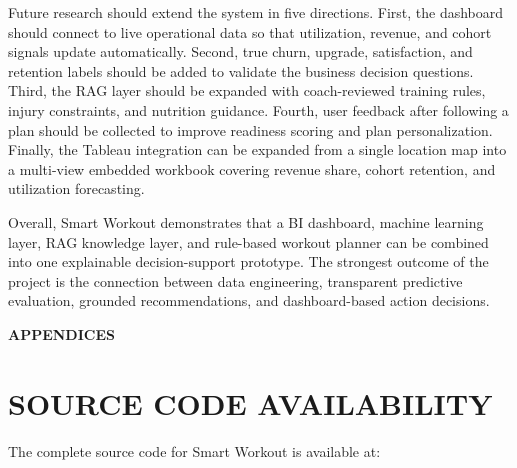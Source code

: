 \documentclass{aitthesis}
\begin{document}
Future research should extend the system in five directions. First, the dashboard should connect to live operational data so that utilization, revenue, and cohort signals update automatically. Second, true churn, upgrade, satisfaction, and retention labels should be added to validate the business decision questions. Third, the RAG layer should be expanded with coach-reviewed training rules, injury constraints, and nutrition guidance. Fourth, user feedback after following a plan should be collected to improve readiness scoring and plan personalization. Finally, the Tableau integration can be expanded from a single location map into a multi-view embedded workbook covering revenue share, cohort retention, and utilization forecasting.

Overall, Smart Workout demonstrates that a BI dashboard, machine learning layer, RAG knowledge layer, and rule-based workout planner can be combined into one explainable decision-support prototype. The strongest outcome of the project is the connection between data engineering, transparent predictive evaluation, grounded recommendations, and dashboard-based action decisions.

\cleardoublepage
{}
{}
\nocite{amoghabhinavms2024,exercisedb,khorasani2024,shamim2025,tharmalingam2023}
\renewcommand{\bibname}{REFERENCES}




\clearpage
{}
{}
\begin{center}
    \vspace*{\fill}
    \large{\bf APPENDICES}
    \vspace*{\fill}
\end{center}
\clearpage

\appendix
\renewcommand{\appendixname}{APPENDIX}
\renewcommand\thefigure{\thechapter\arabic{figure}}
\renewcommand\thetable{\thechapter\arabic{table}}
\captionsetup[table]{labelfont=bf,name=Table\space,labelsep=space}
\captionsetup[figure]{labelfont=bf,name=Figure\space,labelsep=space}

\chapter{SOURCE CODE AVAILABILITY}

The complete source code for Smart Workout is available at:
\end{document}
